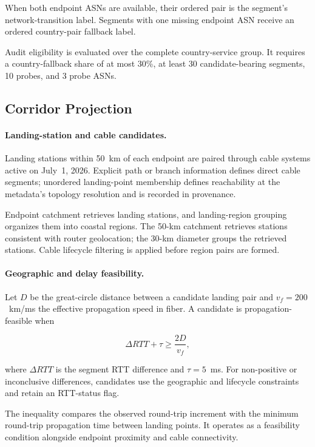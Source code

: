 When both endpoint ASNs are available, their ordered pair is the segment's
network-transition label. Segments with one missing endpoint ASN receive an
ordered country-pair fallback label.

Audit eligibility is evaluated over the complete country-service group. It
requires a country-fallback share of at most 30\%, at least 30
candidate-bearing segments, 10 probes, and 3 probe ASNs.

\subsection{Corridor Projection}
\label{sec:framework_projection}

\paragraph{Landing-station and cable candidates.}
Landing stations within 50~km of each endpoint are paired through cable systems
active on July~1, 2026. Explicit path or branch information defines direct
cable segments; unordered landing-point membership defines reachability at the
metadata's topology resolution and is recorded in provenance.

Endpoint catchment retrieves landing stations, and landing-region grouping
organizes them into coastal regions. The 50-km catchment retrieves stations
consistent with router geolocation; the 30-km diameter groups the retrieved
stations. Cable lifecycle filtering is applied before region pairs are formed.

\paragraph{Geographic and delay feasibility.}
Let \(D\) be the great-circle distance between a candidate landing pair and
\(v_f=200\)~km/ms the effective propagation speed in fiber. A candidate is
propagation-feasible when

\begin{equation}
    \Delta RTT + \tau \geq \frac{2D}{v_f},
    \label{eq:rtt-feasibility}
\end{equation}

where \(\Delta RTT\) is the segment RTT difference and \(\tau=5\)~ms. For
non-positive or inconclusive differences, candidates use the geographic and
lifecycle constraints and retain an RTT-status flag.

The inequality compares the observed round-trip increment with the minimum
round-trip propagation time between landing points. It operates as a feasibility
condition alongside endpoint proximity and cable connectivity.

